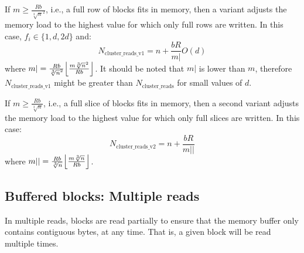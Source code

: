 \documentclass[10pt, conference, compsocconf]{IEEEtran}
\DeclarePairedDelimiter{\floor}{\lfloor}{\rfloor}
\newcommand{\todo}[1]{
  \color{red}\emph{[#1]}
  \color{black}
}
\begin{document}
If $m\geq\frac{Rb}{\sqrt[3]{n}^2}$, i.e., a
full row of blocks fits in memory, then a
variant adjusts the memory load to the
highest value for which only full rows are written. In this
case, $f_i \in \{1,d,2d\}$ and:
\begin{equation}
  N_\mathrm{cluster\_reads\_v1}= n + \frac{bR}{m|}O(d)
\end{equation}
where
$m|=\frac{Rb}{\sqrt[3]{n}^2}\floor*{\frac{m\sqrt[3]{n}^2}{Rb}}$. It
should be noted that $m|$ is lower than $m$, therefore
$N_\mathrm{cluster\_reads\_v1}$ might be greater than
$N_\mathrm{cluster\_reads}$ for small values of $d$.

If $m\geq\frac{Rb}{\sqrt[3]{n}}$, i.e., a full slice of blocks
fits in memory, then a second variant adjusts
the memory load to the highest value for which only full
slices are written. In this case:
\begin{equation}
  N_\mathrm{cluster\_reads\_v2}= n + \frac{bR}{m||}
\end{equation}
where $m||=\frac{Rb}{\sqrt[3]{n}}\floor*{\frac{m\sqrt[3]{n}}{Rb}}$.
    
\subsection{Buffered blocks: Multiple reads}

In multiple reads, blocks are read partially to ensure that the memory
buffer only contains contiguous bytes, at any time. That is, a given
block will be read multiple times.

\end{document}
